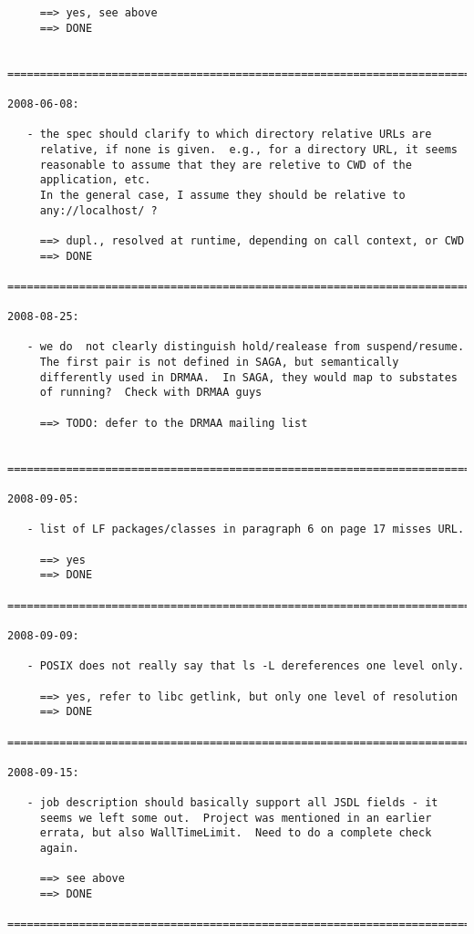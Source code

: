 \documentclass{article}
\begin{document}
\begin{verbatim}
     ==> yes, see above
     ==> DONE
     

=========================================================================

2008-06-08:

   - the spec should clarify to which directory relative URLs are
     relative, if none is given.  e.g., for a directory URL, it seems
     reasonable to assume that they are reletive to CWD of the
     application, etc.
     In the general case, I assume they should be relative to
     any://localhost/ ?

     ==> dupl., resolved at runtime, depending on call context, or CWD
     ==> DONE

=========================================================================

2008-08-25:

   - we do  not clearly distinguish hold/realease from suspend/resume.
     The first pair is not defined in SAGA, but semantically
     differently used in DRMAA.  In SAGA, they would map to substates
     of running?  Check with DRMAA guys

     ==> TODO: defer to the DRMAA mailing list


=========================================================================

2008-09-05:

   - list of LF packages/classes in paragraph 6 on page 17 misses URL.

     ==> yes
     ==> DONE

=========================================================================

2008-09-09:

   - POSIX does not really say that ls -L dereferences one level only.

     ==> yes, refer to libc getlink, but only one level of resolution
     ==> DONE

=========================================================================

2008-09-15:

   - job description should basically support all JSDL fields - it
     seems we left some out.  Project was mentioned in an earlier
     errata, but also WallTimeLimit.  Need to do a complete check
     again.

     ==> see above
     ==> DONE

=========================================================================


\end{verbatim}
\end{document}
